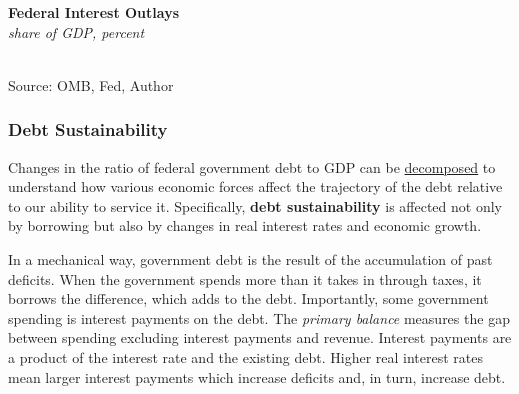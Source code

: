 \documentclass{report}
\makeatletter
\newcommand{\tbllink}[1]{\href{https://raw.githubusercontent.com/bdecon/US-chartbook/master/chartbook/data/#1}{\faTable}}
\newcommand*\short[1]{\expandafter\@gobbletwo\number\numexpr#1\relax}
\newcommand{\absnode}[3]{\node[below right, align=left] at (axis cs: #1,#2) {#3};}
\newcommand{\shdateaxisticks}{
		date coordinates in=x, axis line style={draw=none},
		xmax={2023-02-15},
		max space between ticks=40,	    
		xtick={{1990-01-01}, {1995-01-01}, {2000-01-01}, 
			{2005-01-01}, {2010-01-01}, {2015-01-01}, {2020-01-01}},
		minor xtick={},
		enlarge y limits={0.06}, enlarge x limits={0.01},
		}
\newcommand{\bbar}[2]{extra #1 ticks = {{#2}}, extra #1 tick labels = ,
		extra #1 tick style = {grid=major, grid style={thick, black!25}},}
\newcommand{\dashline}[4]{\addplot[very thick, dashed, no markers, color=#1] 
		table [x=#2, y=#3, col sep=comma] {#4};	}
\newcommand{\thickline}[4]{\addplot[ultra thick, no markers, color=#1] 
		table [x=#2, y=#3, col sep=comma] {#4};	}
\newcommand{\rbars}{
		\fill[color=black!10] (axis cs:{1990-07-01},\pgfkeysvalueof{/pgfplots/ymin}) rectangle 
			(axis cs:{1991-03-01}, \pgfkeysvalueof{/pgfplots/ymax});
		\fill[color=black!10] (axis cs:{2007-12-01},\pgfkeysvalueof{/pgfplots/ymin}) rectangle 
			(axis cs:{2009-07-01}, \pgfkeysvalueof{/pgfplots/ymax});
		\fill[color=black!10] (axis cs:{2001-03-01},\pgfkeysvalueof{/pgfplots/ymin}) rectangle 
			(axis cs:{2001-11-01}, \pgfkeysvalueof{/pgfplots/ymax});
		\fill[color=black!10] (axis cs:{2020-02-01},\pgfkeysvalueof{/pgfplots/ymin}) rectangle 
			(axis cs:{2020-05-01}, \pgfkeysvalueof{/pgfplots/ymax});}
\makeatother
\begin{document}
{\begin{minipage}{0.76\textwidth}
\begin{minipage}{0.46\textwidth}
\small 
\end{minipage} \hfill \begin{minipage}{0.48\textwidth}
\normalsize \textbf{Federal Interest Outlays}\\
\footnotesize{\textit{share of GDP, percent}}\\
\hspace*{-2mm} \\
\footnotesize{Source: OMB, Fed, Author} \hfill \tbllink{fedintexp.csv}
\end{minipage} 
\vspace{1mm}

\small 
\end{minipage}
\newpage
\begin{minipage}{0.76\textwidth}
\subsubsection*{Debt Sustainability}
\small Changes in the ratio of federal government debt to GDP can be \href{https://www.imf.org/en/Publications/TNM/Issues/2016/12/31/A-Practical-Guide-to-Public-Debt-Dynamics-Fiscal-Sustainability-and-Cyclical-Adjustment-of-23498}{decomposed} to understand how various economic forces affect the trajectory of the debt relative to our ability to service it. Specifically, \textbf{debt sustainability} is affected not only by borrowing but also by changes in real interest rates and economic growth. 

In a mechanical way, government debt is the result of the accumulation of past deficits. When the government spends more than it takes in through taxes, it borrows the difference, which adds to the debt. Importantly, some government spending is interest payments on the debt. The \textit{primary balance} measures the gap between spending excluding interest payments and revenue. Interest payments are a product of the interest rate and the existing debt. Higher real interest rates mean larger interest payments which increase deficits and, in turn, increase debt.


\end{minipage}}
\end{document}
